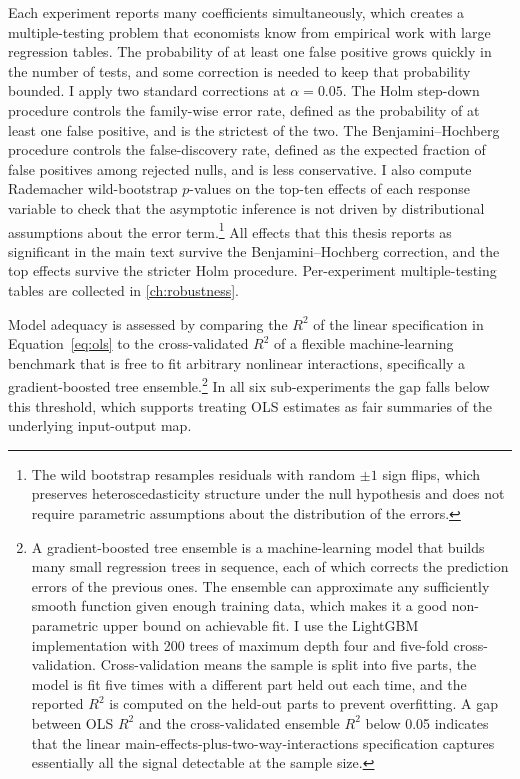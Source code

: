 Each experiment reports many coefficients simultaneously, which creates a multiple-testing problem that economists know from empirical work with large regression tables. The probability of at least one false positive grows quickly in the number of tests, and some correction is needed to keep that probability bounded. I apply two standard corrections at $\alpha = 0.05$. The Holm step-down procedure \citep{Holm1979} controls the family-wise error rate, defined as the probability of at least one false positive, and is the strictest of the two. The Benjamini--Hochberg procedure \citep{BenjaminiHochberg1995} controls the false-discovery rate, defined as the expected fraction of false positives among rejected nulls, and is less conservative. I also compute Rademacher wild-bootstrap $p$-values on the top-ten effects of each response variable to check that the asymptotic inference is not driven by distributional assumptions about the error term.\footnote{The wild bootstrap \citep{DavidsonFlachaire2008} resamples residuals with random $\pm 1$ sign flips, which preserves heteroscedasticity structure under the null hypothesis and does not require parametric assumptions about the distribution of the errors.} All effects that this thesis reports as significant in the main text survive the Benjamini--Hochberg correction, and the top effects survive the stricter Holm procedure. Per-experiment multiple-testing tables are collected in \cref{ch:robustness}.

Model adequacy is assessed by comparing the $R^2$ of the linear specification in Equation~\ref{eq:ols} to the cross-validated $R^2$ of a flexible machine-learning benchmark that is free to fit arbitrary nonlinear interactions, specifically a gradient-boosted tree ensemble.\footnote{A gradient-boosted tree ensemble is a machine-learning model that builds many small regression trees in sequence, each of which corrects the prediction errors of the previous ones. The ensemble can approximate any sufficiently smooth function given enough training data, which makes it a good non-parametric upper bound on achievable fit. I use the LightGBM implementation with 200 trees of maximum depth four and five-fold cross-validation. Cross-validation means the sample is split into five parts, the model is fit five times with a different part held out each time, and the reported $R^2$ is computed on the held-out parts to prevent overfitting. A gap between OLS $R^2$ and the cross-validated ensemble $R^2$ below 0.05 indicates that the linear main-effects-plus-two-way-interactions specification captures essentially all the signal detectable at the sample size.} In all six sub-experiments the gap falls below this threshold, which supports treating OLS estimates as fair summaries of the underlying input-output map.

